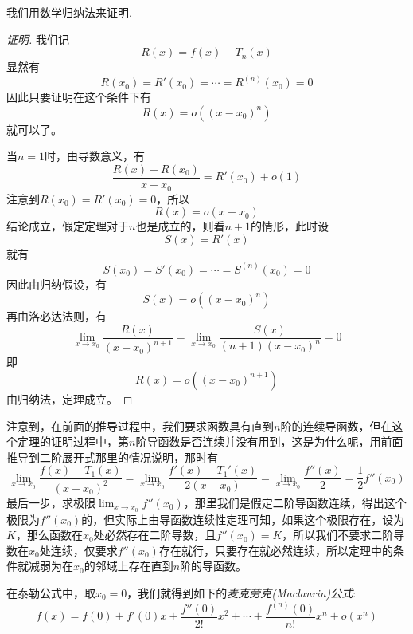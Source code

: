 我们用数学归纳法来证明.
\begin{proof}[证明]
  我们记
  \[ R(x) = f(x) - T_n(x) \]
  显然有
  \[ R(x_0) = R'(x_0) = \cdots = R^{(n)}(x_0) = 0 \]
  因此只要证明在这个条件下有
  \[ R(x) = o((x-x_0)^n) \]
  就可以了。
  
  当$n=1$时，由导数意义，有
  \[ \frac{R(x)-R(x_0)}{x-x_0} = R'(x_0) + o(1) \]
  注意到$R(x_0)=R'(x_0)=0$，所以
  \[ R(x) =  o(x-x_0) \]
  结论成立，假定定理对于$n$也是成立的，则看$n+1$的情形，此时设
  \[ S(x) = R'(x) \]
  就有
  \[ S(x_0) = S'(x_0) = \cdots = S^{(n)}(x_0) = 0 \]
  因此由归纳假设，有
  \[ S(x) = o((x-x_0)^n) \]
  再由洛必达法则，有
  \[ \lim_{x \to x_0} \frac{R(x)}{(x-x_0)^{n+1}} = \lim_{x \to x_0} \frac{S(x)}{(n+1)(x-x_0)^n} = 0 \]
  即
  \[ R(x) = o((x-x_0)^{n+1}) \]
  由归纳法，定理成立。
\end{proof}

注意到，在前面的推导过程中，我们要求函数具有直到$n$阶的连续导函数，但在这个定理的证明过程中，第$n$阶导函数是否连续并没有用到，这是为什么呢，用前面推导到二阶展开式那里的情况说明，那时有
\[ \lim_{x \to x_0} \frac{f(x)-T_1(x)}{(x-x_0)^2} = \lim_{x \to x_0} \frac{f'(x)-T_1'(x)}{2(x-x_0)} = \lim_{x \to x_0} \frac{f''(x)}{2} = \frac{1}{2} f''(x_0) \]
最后一步，求极限$\lim_{x \to x_0} f''(x_0)$，那里我们是假定二阶导函数连续，得出这个极限为$f''(x_0)$的，但实际上由导函数连续性定理可知，如果这个极限存在，设为$K$，那么函数在$x_0$处必然存在二阶导数，且$f''(x_0)=K$，所以我们不要求二阶导数在$x_0$处连续，仅要求$f''(x_0)$存在就行，只要存在就必然连续，所以定理中的条件就减弱为在$x_0$的邻域上存在直到$n$阶的导函数。

在泰勒公式中，取$x_0 = 0$，我们就得到如下的\emph{麦克劳克(Maclaurin)公式}:
\[ f(x) = f(0) + f'(0)x + \frac{f''(0)}{2!}x^2 + \cdots + \frac{f^{(n)}(0)}{n!}x^n + o(x^n) \]

